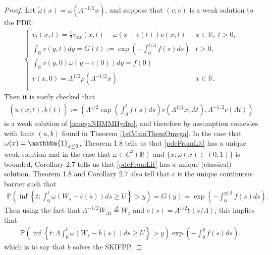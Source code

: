 \documentclass{article}
\newcommand{\B}[1]{\mathbb{#1}}
\newcommand{\is}{\mathbbm{1}}
\begin{document}
\begin{proof}
    Let $\tilde{\omega}(x)=\omega(\Lambda^{-1/2}x)$, and suppose that $(v,c)$ is a weak solution to the PDE:
    \begin{align}\label{pdeFromLit}
    \begin{cases}
        v_t(x,t) = \frac12 v_{xx}(x,t) -\tilde{\omega}(x-c(t))v(x,t) & x\in \B{R},\;t>0,\\
        \int_\B{R} v(y,t)dy = G(t):=\exp(-\int_0^{t/\Lambda}f(s)ds) & t>0,\\
        \int_{\B{R}} v(y,0)\omega(y-c(0))dy=f(0)\\
        v(x,0)=\Lambda^{1/2}\rho(\Lambda^{-1/2}x) & x\in \B{R}.\\
    \end{cases}
    \end{align}
    Then it is easily checked that \begin{align*}(\tilde{u}(x,t),\tilde{b}(t)):=\left(\Lambda^{1/2}\exp(\int_0^t f(s)ds)v(\Lambda^{1/2}x,\Lambda t),\Lambda^{-1/2}c(\Lambda t)\right)\end{align*}
    is a weak solution of \eqref{omegaNBMMHydro}, and therefore by assumption coincides with limit $(u,b)$ found in Theorem \ref{1stMainThemOmega}. In the case that $\omega(x)=\is_{x\leq 0}$, Theorem 1.8 \cite{ettingerHeningKwong} tells us that \eqref{pdeFromLit} has a unique weak solution and in the case that $\omega\in C^3(\B{R})$ and $\{x:\omega(x)\in (0,1)\}$ is bounded, Corollary 2.7 \cite{ettingerHeningEvans} tells us that \eqref{pdeFromLit} has a unique (classical) solution. Theorem 1.8 \cite{ettingerHeningKwong} and Corollary 2.7 \cite{ettingerHeningEvans} also tell that $c$ is the unique continuous barrier such that
    \begin{align*}
    \B{P}\left(\inf\left\{t:\int_0^t \omega(W_s-c(s))ds \geq U\right\}>y\right)=G(y)=\exp(-\int_0^{y/\Lambda}f(s)ds).
    \end{align*}
    Then using the fact that $\Lambda^{-1/2}W_{\Lambda z}\overset{d}{=}W_z$ and $c(s)=\Lambda^{1/2}b(s/\Lambda)$, this implies that
    \begin{align*}
        \B{P}\left(\inf\left\{t:\Lambda \int_0^t \omega(W_s - b(s))ds\geq U\right\}>y\right)\exp(-\int_0^y f(s)ds),
    \end{align*}
    which is to say that $b$ solves the SKIFPP. 
\end{proof}
\end{document}
